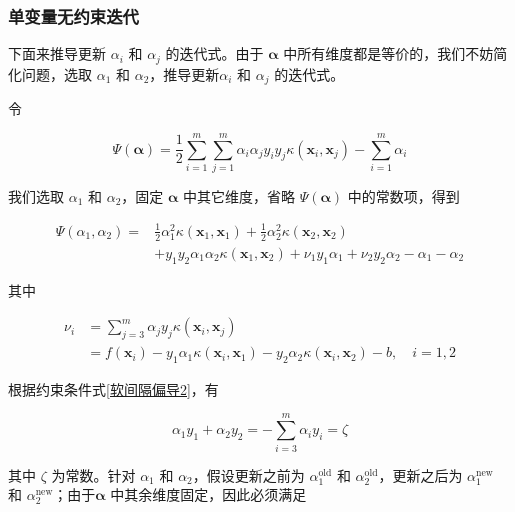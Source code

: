 \documentclass{ctexart}
\begin{document}
	\subsubsection{单变量无约束迭代}
	
	下面来推导更新 $\alpha_i$ 和 $\alpha_j$ 的迭代式。由于 $\boldsymbol{\alpha}$ 中所有维度都是等价的，我们不妨简化问题，选取 $\alpha_1$ 和 $\alpha_2$，推导更新$\alpha_i$ 和 $\alpha_j$ 的迭代式。
	
	令
	
	\begin{equation}
		\Psi(\boldsymbol{\alpha})=\frac{1}{2} \sum_{i=1}^{m} \sum_{j=1}^{m} \alpha_{i} \alpha_{j} y_{i} y_{j} \kappa\left(\boldsymbol{x}_{i},\boldsymbol{x}_{j} \right)-\sum_{i=1}^{m} \alpha_{i}
		\label{求的函数}
	\end{equation}

	我们选取 $\alpha_1$ 和 $\alpha_2$，固定 $\boldsymbol{\alpha}$ 中其它维度，省略 $\Psi(\boldsymbol{\alpha})$ 中的常数项，得到
	
	\begin{equation}
		\begin{aligned}
			\Psi(\alpha_1,\alpha_2)=&\frac{1}{2}\alpha_{1}^2\kappa(\boldsymbol{x}_1,\boldsymbol{x}_1)+\frac{1}{2}\alpha_{2}^2\kappa(\boldsymbol{x}_2,\boldsymbol{x}_2)\\
			&+y_1y_2\alpha_{1}\alpha_{2}\kappa(\boldsymbol{x}_1,\boldsymbol{x}_2)+\nu_1y_1\alpha_{1}+\nu_2y_2\alpha_{2}-\alpha_{1}-\alpha_{2}
		\end{aligned}
	\end{equation}

	其中
	
	\begin{equation}
		\begin{aligned}
			\nu_i&=\sum_{j=3}^m \alpha_{j}y_j\kappa(\boldsymbol{x}_i,\boldsymbol{x}_j)\\
			&=f(\boldsymbol{x}_i)-y_1\alpha_{1}\kappa(\boldsymbol{x}_i,\boldsymbol{x}_1)-y_2\alpha_{2}\kappa(\boldsymbol{x}_i,\boldsymbol{x}_2)-b,\quad i=1,2
			\label{nu}
		\end{aligned}
	\end{equation}
	
	根据约束条件式\eqref{软间隔偏导2}，有
	
	\begin{equation}
		\alpha_1y_1+\alpha_{2}y_2=-\sum_{i=3}^m\alpha_{i}y_i=\zeta
		\label{双约束}
	\end{equation}
 
	其中 $\zeta$ 为常数。针对 $\alpha_{1}$ 和 $\alpha_{2}$，假设更新之前为 $\alpha_{1}^\text{old}$ 和 $\alpha_{2}^\text{old}$，更新之后为 $\alpha_{1}^\text{new}$ 和 $\alpha_{2}^\text{new}$；由于$\boldsymbol{\alpha}$ 中其余维度固定，因此必须满足
	
\end{document}
